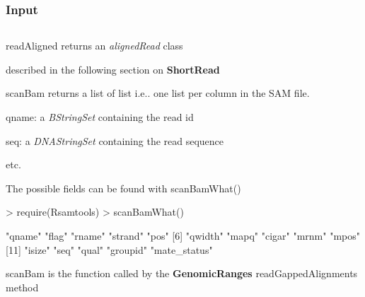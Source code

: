 \documentclass{beamer}
\begin{document}

\begin{frame}[fragile]
\frametitle{Input}
\begin{column}{1\textwidth}
  \bit
      \item   \small{readAligned} returns an \emph{alignedRead} class
        \bit
            \item described in the following section on \textbf{ShortRead}
        \eit
      \item \small{scanBam} returns a list of list i.e.. one list per column in the SAM file.
        \bit
            \item qname: a \emph{BStringSet} containing the read id 
            \item seq: a \emph{DNAStringSet} containing the read sequence
            \item etc.
            \item The possible fields can be found with \small{scanBamWhat()}
              \begin{uncoverenv}
\begin{Schunk}
\begin{Sinput}
> require(Rsamtools)
> scanBamWhat()
\end{Sinput}
\begin{Soutput}
 [1] "qname"       "flag"        "rname"       "strand"      "pos"        
 [6] "qwidth"      "mapq"        "cigar"       "mrnm"        "mpos"       
[11] "isize"       "seq"         "qual"        "groupid"     "mate_status"
\end{Soutput}
\end{Schunk}
        \end{uncoverenv}    
        \eit
      \item \small{scanBam} is the function called by the \textbf{GenomicRanges} \small{readGappedAlignments} method
  \eit
  \end{column}
\end{frame}

\end{document}
